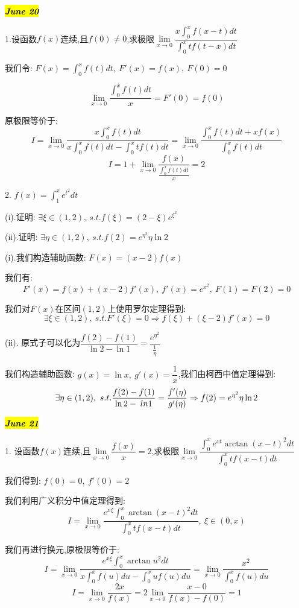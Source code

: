 
\hl{\textbf{\textit{June 20}}}

1.设函数$f(x)$连续,且$f(0)\neq 0$,求极限$\lim\limits_{x\rightarrow 0}\dfrac{x\int_{0}^{x}f(x-t)dt}{\int_{0}^{x}tf(t-x)dt}$
\begin{solution}
	
	我们令: $F(x)=\int_{0}^{x}f(t)dt,\ F'(x)=f(x),\ F(0)=0$
	
	$$\lim\limits_{x\rightarrow 0}\dfrac{\int_{0}^{x}f(t)dt}{x}=F'(0)=f(0)$$
	
	原极限等价于: 
	$$I=\lim\limits_{x\rightarrow 0}\dfrac{x\int_{0}^{x}f(t)dt}{x\int_{0}^{x}f(t)dt-\int_{0}^{x}tf(t)dt}=\lim\limits_{x\rightarrow 0}\dfrac{\int_{0}^{x}f(t)dt+xf(x)}{\int_{0}^{x}f(t)dt}$$
	$$I=1+\lim\limits_{x\rightarrow 0}\dfrac{f(x)}{\frac{\int_{0}^{x}f(t)dt}{x}}=2$$
\end{solution}


2. $f(x)=\int_{1}^{x}e^{t^2}dt$

(i).证明: $\exists \xi\in(1,2),\ s.t. f(\xi)=(2-\xi)e^{\xi^2}$

(ii).证明: $\exists \eta \in(1,2),\ s.t. f(2)= e^{\eta^2}\eta \ln 2$
\begin{solution}
	
	(i).我们构造辅助函数: $F(x)=(x-2)f(x)$
	
	我们有: $$F'(x)=f(x)+(x-2)f'(x),\ f'(x)=e^{x^2},\ F(1)=F(2)=0$$
	
	我们对$F(x)$在区间$(1,2)$上使用罗尔定理得到: 
	$$\exists \xi\in(1,2),\ s.t. F'(\xi)=0\Rightarrow f(\xi)+(\xi-2)f'(x)=0$$
	
	(ii). 原式子可以化为$\dfrac{f(2)-f(1)}{\ln 2-\ln 1}=\dfrac{e^{\eta^2}}{\frac{1}{\eta}}$
	
	我们构造辅助函数: $g(x)=\ln x,\ g'(x)=\dfrac{1}{x}$,我们由柯西中值定理得到: 
	$$\exists \eta\in(1,2),\ s.t. \dfrac{f(2)-f(1)}{\ln 2-\\ln 1}=\dfrac{f'(\eta)}{g'(\eta)}\Rightarrow f(2)=e^{\eta^2}\eta \ln 2$$
\end{solution}


\hl{\textbf{\textit{June 21}}}

1. 设函数$f(x)$连续,且$\lim\limits_{x\rightarrow 0}\dfrac{f(x)}{x}=2$,求极限$\lim\limits_{x\rightarrow 0}\dfrac{\int_{0}^{x}e^{xt}\arctan(x-t)^2dt}{\int_{0}^{x}tf(x-t)dt}$
\begin{solution}
	
	我们得到: $f(0)=0,\ f'(0)=2$
	
	我们利用广义积分中值定理得到: 
	$$I=\lim\limits_{x\rightarrow 0}\dfrac{e^{x\xi}\int_{0}^{x}\arctan(x-t)^2dt}{\int_{0}^{x}tf(x-t)dt},\ \xi\in(0,x)$$
	
	我们再进行换元,原极限等价于: 
	$$I=\lim\limits_{x\rightarrow 0}\dfrac{e^{x\xi}\int_{0}^{x}\arctan u^2dt}{x\int_{0}^{x}f(u)du-\int_{0}^{x}uf(u)du}=\lim\limits_{x\rightarrow 0}\dfrac{x^2}{\int_{0}^{x}f(u)du}$$
	$$I=\lim\limits_{x\rightarrow 0}\dfrac{2x}{f(x)}=2\lim\limits_{x\rightarrow 0}\dfrac{x-0}{f(x)-f(0)}=1$$
\end{solution}

